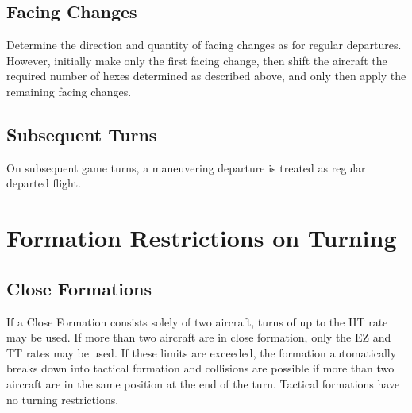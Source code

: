 \begin{advancedrules}
    \subsection{Facing Changes} Determine the direction and quantity of facing changes as for regular departures. However, initially make only the first facing change, then shift the aircraft the required number of hexes determined as described above, and only then apply the remaining facing changes.


    \subsection{Subsequent Turns} On subsequent game turns, a maneuvering departure is treated as regular departed flight.

    \section{Formation Restrictions on Turning}

    \subsection{Close Formations} If a Close Formation consists solely of two aircraft, turns of up to the HT rate may be used. If more than two aircraft are in close formation, only the EZ and TT rates may be used. If these limits are exceeded, the formation automatically breaks down into tactical formation and collisions are possible if more than two aircraft are in the same position at the end of the turn. Tactical formations have no turning restrictions.

\end{advancedrules}
